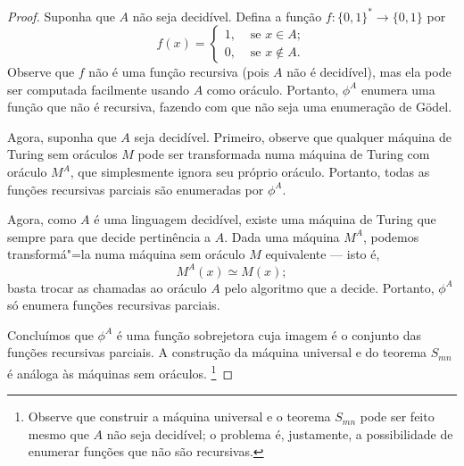 \begin{proof}
    Suponha que $A$ não seja decidível.
    Defina a função $f: \{0, 1\}^* \to \{0, 1\}$ por
    \begin{equation*}
        f(x) =
        \begin{cases}
            1,& \text{ se } x \in A; \\
            0,& \text{ se } x \notin A.
        \end{cases}
    \end{equation*}
    Observe que $f$ não é uma função recursiva
    (pois $A$ não é decidível),
    mas ela pode ser computada facilmente usando $A$ como oráculo.
    Portanto, $\phi^A$ enumera uma função que não é recursiva,
    fazendo com que não seja uma enumeração de Gödel.

    Agora, suponha que $A$ seja decidível.
    Primeiro,
    observe que qualquer máquina de Turing sem oráculos $M$
    pode ser transformada numa máquina de Turing com oráculo $M^A$,
    que simplesmente ignora seu próprio oráculo.
    Portanto,
    todas as funções recursivas parciais são enumeradas por $\phi^A$.

    Agora,
    como $A$ é uma linguagem decidível,
    existe uma máquina de Turing que sempre para que decide pertinência a $A$.
    Dada uma máquina $M^A$,
    podemos transformá"=la numa máquina sem oráculo $M$
    equivalente --- isto é,
    \begin{equation*}
        M^A(x) \simeq M(x);
    \end{equation*}
    basta trocar as chamadas ao oráculo $A$
    pelo algoritmo que a decide.
    Portanto, $\phi^A$ só enumera funções recursivas parciais.

    Concluímos que $\phi^A$ é uma função sobrejetora
    cuja imagem é o conjunto das funções recursivas parciais.
    A construção da máquina universal
    e do teorema $S_{mn}$ é análoga às máquinas sem oráculos.%
    \footnote{
        Observe que construir a máquina universal
        e o teorema $S_{mn}$ pode ser feito mesmo que $A$ não seja decidível;
        o problema é, justamente,
        a possibilidade de enumerar funções que não são recursivas.
    }
\end{proof}
